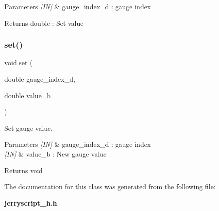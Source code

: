 \begin{DoxyParams}{Parameters}
{\em \mbox{[}\+I\+N\mbox{]}} & gauge\+\_\+index\+\_\+d \+: gauge index \\
\hline
\end{DoxyParams}
\begin{DoxyReturn}{Returns}
double \+: Set value 
\end{DoxyReturn}
\mbox{\label{classgauge_a1b342babb211d18a1467f54edb165fdd}} 
\subsubsection{set()}
{\footnotesize\ttfamily void set (\begin{DoxyParamCaption}\item[{double}]{gauge\+\_\+index\+\_\+d,  }\item[{double}]{value\+\_\+b }\end{DoxyParamCaption})}



Set gauge value. 


\begin{DoxyCode}{0}
\end{DoxyCode}



\begin{DoxyParams}{Parameters}
{\em \mbox{[}\+I\+N\mbox{]}} & gauge\+\_\+index\+\_\+d \+: gauge index \\
\hline
{\em \mbox{[}\+I\+N\mbox{]}} & value\+\_\+b \+: New gauge value \\
\hline
\end{DoxyParams}
\begin{DoxyReturn}{Returns}
void 
\end{DoxyReturn}


The documentation for this class was generated from the following file\+:\begin{DoxyCompactItemize}
\item 
\textbf{ jerryscript\+\_\+h.\+h}\end{DoxyCompactItemize}
